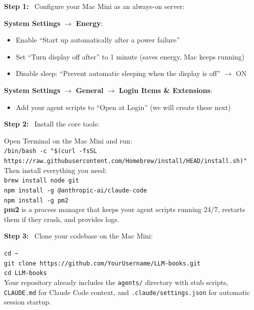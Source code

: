 \documentclass[12pt, letterpaper, oneside]{book}
\newcommand{\step}[1]{\noindent\textbf{\textcolor{primary}{Step #1:}}~}
\begin{document}
\step{1} Configure your Mac Mini as an always-on server:
\begin{actionbox}
\textbf{System Settings} $\rightarrow$ \textbf{Energy}:\\
\begin{itemize}[leftmargin=1.5em]
  \item Enable ``Start up automatically after a power failure''
  \item Set ``Turn display off after'' to 1 minute (saves energy, Mac keeps running)
  \item Disable sleep: ``Prevent automatic sleeping when the display is off'' $\rightarrow$ ON
\end{itemize}
\textbf{System Settings} $\rightarrow$ \textbf{General} $\rightarrow$ \textbf{Login Items \& Extensions}:\\
\begin{itemize}[leftmargin=1.5em]
  \item Add your agent scripts to ``Open at Login'' (we will create these next)
\end{itemize}
\end{actionbox}

\step{2} Install the core tools:
\begin{actionbox}
Open Terminal on the Mac Mini and run:\\[4pt]
\texttt{/bin/bash -c "\$(curl -fsSL https://raw.githubusercontent.com/Homebrew/install/HEAD/install.sh)"}\\[4pt]
Then install everything you need:\\[4pt]
\texttt{brew install node git}\\
\texttt{npm install -g @anthropic-ai/claude-code}\\
\texttt{npm install -g pm2}\\[4pt]
\textbf{pm2} is a process manager that keeps your agent scripts running 24/7, restarts them if they crash, and provides logs.
\end{actionbox}

\step{3} Clone your codebase on the Mac Mini:
\begin{actionbox}
\texttt{cd \~{}}\\
\texttt{git clone https://github.com/YourUsername/LLM-books.git}\\
\texttt{cd LLM-books}\\[4pt]
Your repository already includes the \texttt{agents/} directory with stub scripts, \texttt{CLAUDE.md} for Claude Code context, and \texttt{.claude/settings.json} for automatic session startup.
\end{actionbox}
\end{document}
